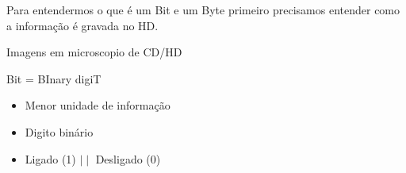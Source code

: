 Para entendermos o que é um Bit e um Byte primeiro precisamos entender como a informação é gravada no HD.

Imagens em microscopio de CD/HD

\vfil\null
\pagebreak

\pagecolor{black}

\color{white}

\Huge Bit = BInary digiT

\begin{itemize}
	\item Menor unidade de informação
	\item Digito binário
	\item Ligado (1) $\mid\mid$ Desligado (0)
\end{itemize}

\begin{center}
	\resizebox{125mm}{50mm}{{\color{white}$\fullmoon\newmoon$}}
\end{center}

\vfil\null
\pagebreak
\pagecolor{white}
